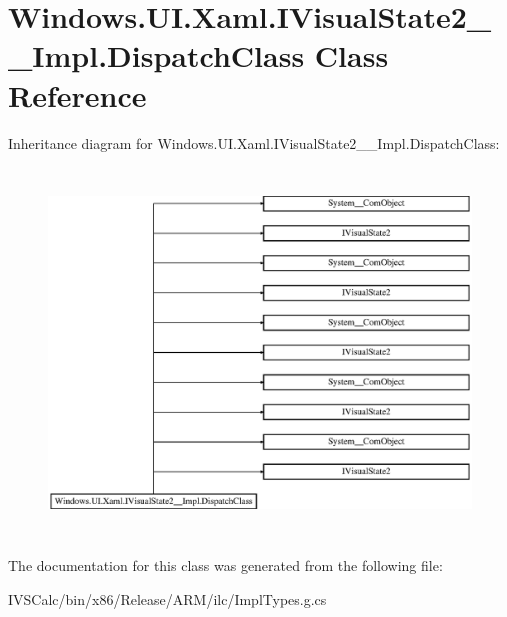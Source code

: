 \hypertarget{class_windows_1_1_u_i_1_1_xaml_1_1_i_visual_state2_____impl_1_1_dispatch_class}{}\section{Windows.\+U\+I.\+Xaml.\+I\+Visual\+State2\+\_\+\+\_\+\+Impl.\+Dispatch\+Class Class Reference}
\label{class_windows_1_1_u_i_1_1_xaml_1_1_i_visual_state2_____impl_1_1_dispatch_class}
Inheritance diagram for Windows.\+U\+I.\+Xaml.\+I\+Visual\+State2\+\_\+\+\_\+\+Impl.\+Dispatch\+Class\+:\begin{figure}[H]
\begin{center}
\leavevmode
\includegraphics[height=9.808917cm]{class_windows_1_1_u_i_1_1_xaml_1_1_i_visual_state2_____impl_1_1_dispatch_class}
\end{center}
\end{figure}


The documentation for this class was generated from the following file\+:\begin{DoxyCompactItemize}
\item 
I\+V\+S\+Calc/bin/x86/\+Release/\+A\+R\+M/ilc/Impl\+Types.\+g.\+cs\end{DoxyCompactItemize}
